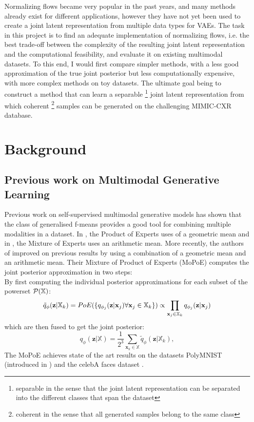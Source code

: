 \documentclass[english]{scrartcl}
\begin{document}
    Normalizing flows became very popular in the past years, and many methods already exist for different applications, however they have not yet been used to create a joint latent representation from multiple data types for VAEs.
    The task in this project is to find an adequate implementation of normalizing flows, i.e. the best trade-off between the complexity of the resulting joint latent representation and the computational feasibility, and evaluate it on existing multimodal datasets.
    To this end, I would first compare simpler methods, with a less good approximation of the true joint posterior but less computationally expensive, with more complex methods on toy datasets.
    The ultimate goal being to construct a method that can learn a separable \footnote{separable in the sense that the joint latent representation can be separated into the different classes that span the dataset} joint latent representation from which coherent \footnote{coherent in the sense that all generated samples belong to the same class} samples can be generated on the challenging MIMIC-CXR \parencite{johnson_mimic-cxr-jpg_2019} database.


    \section{Background}

    \subsection{Previous work on Multimodal Generative Learning} \label{subsec:prevwork_mopoe}
    Previous work on self-supervised multimodal generative models has shown that the class of generalised f-means provides a good tool for combining multiple modalities in a dataset.
    In \citep[PoE]{wu_multimodal_2018}, the Product of Experts uses of a geometric mean and in \citep[MoE]{shi_variational_2019}, the Mixture of Experts uses an arithmetic mean.
    More recently, the authors of \citep[MoPoE]{sutter_generalized_2020} improved on previous results by using a combination of a geometric mean and an arithmetic mean.
    Their Mixture of Product of Experts (MoPoE) computes the joint posterior approximation in two steps:\\
    By first computing the individual posterior approximations for each subset of the powerset $\mathcal{P}(\mathbb{X})$:
    \begin{equation}
        \tilde{q}_{\phi}(\textbf{z}|\mathbb{X}_k)=PoE(\{q_{\phi_j}(\textbf{z}|\textbf{x}_j) \forall \textbf{x}_j \in \mathbb{X}_k\}) \propto \prod _{\textbf{x}_j \in \mathbb{X}_k}q_{\phi_j}(\textbf{z}|\textbf{x}_j)
    \end{equation}
    which are then fused to get the joint posterior:
    \begin{equation}
        q_{\phi}(\textbf{z}|\mathbb{X}) = \frac{1}{2^3} \sum _{\textbf{x}_k \in \mathbb{X}} \tilde{q}_{\phi} (\textbf{z}|\mathbb{X}_k),
    \end{equation}
    The MoPoE achieves state of the art results on the datasets PolyMNIST (introduced in \citet{sutter_multimodal_2020}) and the celebA faces dataset \citep{liu_deep_2015}.
\end{document}
